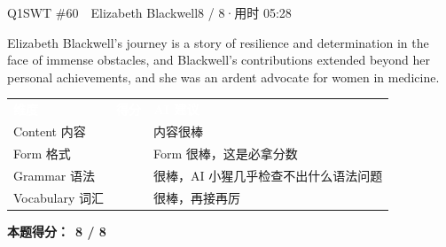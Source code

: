 \begin{qblock}{Q1\quad SWT \#60\ \ Elizabeth Blackwell}{8 / 8\quad·\quad 用时 05:28}
\begin{youbox}
Elizabeth Blackwell's journey is a story of resilience and determination in the face of immense obstacles, and Blackwell's contributions extended beyond her personal achievements, and she was an ardent advocate for women in medicine.
\end{youbox}

{\small\scorehead
\begin{tabularx}{\linewidth}{l c Y}
\textcolor{white}{\bfseries 维度} & \textcolor{white}{\bfseries 得分} & \textcolor{white}{\bfseries AI 建议}\\
Content 内容        &  & 内容很棒\\
Form 格式          &  & Form 很棒，这是必拿分数\\
Grammar 语法       &  & 很棒，AI 小猩几乎检查不出什么语法问题\\
Vocabulary 词汇    &  & 很棒，再接再厉\\
\end{tabularx}}
\smallskip
\textbf{本题得分：}\ {\color{cAccent}\bfseries 8 / 8}

\end{qblock}

